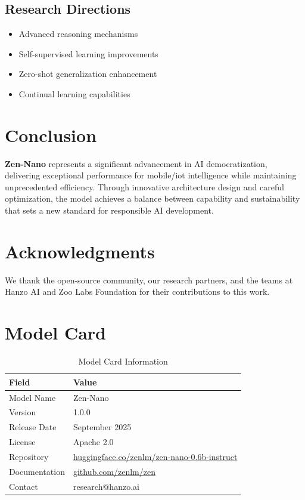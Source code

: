 \documentclass[11pt,a4paper]{article}
\begin{document}
\subsection{Research Directions}
\begin{itemize}
    \item Advanced reasoning mechanisms
    \item Self-supervised learning improvements
    \item Zero-shot generalization enhancement
    \item Continual learning capabilities
\end{itemize}

\section{Conclusion}

\textbf{Zen-Nano} represents a significant advancement in AI democratization, 
delivering exceptional performance for mobile/iot intelligence while maintaining 
unprecedented efficiency. Through innovative architecture design and careful optimization, 
the model achieves a balance between capability and sustainability that sets a new standard 
for responsible AI development.

\section*{Acknowledgments}

We thank the open-source community, our research partners, and the teams at Hanzo AI and 
Zoo Labs Foundation for their contributions to this work.

\appendix

\section{Model Card}

\begin{table}[H]
\centering
\begin{tabular}{ll}
\toprule
\textbf{Field} & \textbf{Value} \\
\midrule
Model Name & Zen-Nano \\
Version & 1.0.0 \\
Release Date & September 2025 \\
License & Apache 2.0 \\
Repository & \href{https://huggingface.co/zenlm/zen-nano-0.6b-instruct}{huggingface.co/zenlm/zen-nano-0.6b-instruct} \\
Documentation & \href{https://github.com/zenlm/zen}{github.com/zenlm/zen} \\
Contact & research@hanzo.ai \\
\bottomrule
\end{tabular}
\caption{Model Card Information}
\end{table}
\end{document}
